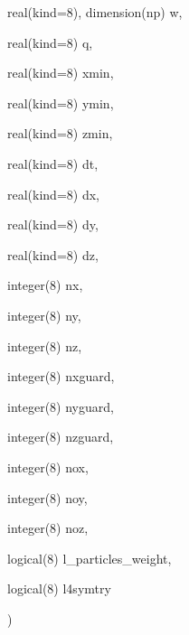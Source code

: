 {\begin{DoxyParamCaption}
\item[{real(kind=8), dimension(np)}]{w, }
\item[{real(kind=8)}]{q, }
\item[{real(kind=8)}]{xmin, }
\item[{real(kind=8)}]{ymin, }
\item[{real(kind=8)}]{zmin, }
\item[{real(kind=8)}]{dt, }
\item[{real(kind=8)}]{dx, }
\item[{real(kind=8)}]{dy, }
\item[{real(kind=8)}]{dz, }
\item[{integer(8)}]{nx, }
\item[{integer(8)}]{ny, }
\item[{integer(8)}]{nz, }
\item[{integer(8)}]{nxguard, }
\item[{integer(8)}]{nyguard, }
\item[{integer(8)}]{nzguard, }
\item[{integer(8)}]{nox, }
\item[{integer(8)}]{noy, }
\item[{integer(8)}]{noz, }
\item[{logical(8)}]{l\+\_\+particles\+\_\+weight, }
\item[{logical(8)}]{l4symtry}
\end{DoxyParamCaption}
)}\hypertarget{current__deposition_8_f90_af8faa4a1c6a61774bcfddd4519751c41}{}\label{current__deposition_8_f90_af8faa4a1c6a61774bcfddd4519751c41}
